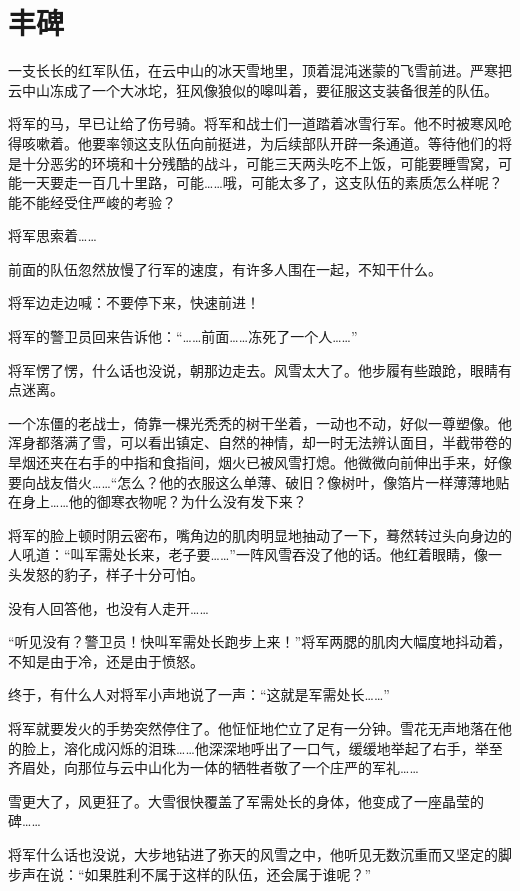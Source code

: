 \documentclass[12pt,UTF-8,openany]{ctexbook}
\begin{document}
\chapter{丰碑}

\begin{large}
    
    一支长长的红军队伍，在云中山的冰天雪地里，顶着混沌迷蒙的飞雪前进。严寒把云中山冻成了一个大冰坨，狂风像狼似的嗥叫着，要征服这支装备很差的队伍。
    
    将军的马，早已让给了伤号骑。将军和战士们一道踏着冰雪行军。他不时被寒风呛得咳嗽着。他要率领这支队伍向前挺进，为后续部队开辟一条通道。等待他们的将是十分恶劣的环境和十分残酷的战斗，可能三天两头吃不上饭，可能要睡雪窝，可能一天要走一百几十里路，可能……哦，可能太多了，这支队伍的素质怎么样呢？能不能经受住严峻的考验？
    
    将军思索着……
    
    前面的队伍忽然放慢了行军的速度，有许多人围在一起，不知干什么。
    
    将军边走边喊：不要停下来，快速前进！
    
    将军的警卫员回来告诉他：“……前面……冻死了一个人……”
    
    将军愣了愣，什么话也没说，朝那边走去。风雪太大了。他步履有些踉跄，眼睛有点迷离。
    
    一个冻僵的老战士，倚靠一棵光秃秃的树干坐着，一动也不动，好似一尊塑像。他浑身都落满了雪，可以看出镇定、自然的神情，却一时无法辨认面目，半截带卷的旱烟还夹在右手的中指和食指间，烟火已被风雪打熄。他微微向前伸出手来，好像要向战友借火……“怎么？他的衣服这么单薄、破旧？像树叶，像箔片一样薄薄地贴在身上……他的御寒衣物呢？为什么没有发下来？
    
    将军的脸上顿时阴云密布，嘴角边的肌肉明显地抽动了一下，蓦然转过头向身边的人吼道：“叫军需处长来，老子要……”一阵风雪吞没了他的话。他红着眼睛，像一头发怒的豹子，样子十分可怕。
    
    没有人回答他，也没有人走开……
    
    “听见没有？警卫员！快叫军需处长跑步上来！”将军两腮的肌肉大幅度地抖动着，不知是由于冷，还是由于愤怒。
    
    终于，有什么人对将军小声地说了一声：“这就是军需处长……”
    
    将军就要发火的手势突然停住了。他怔怔地伫立了足有一分钟。雪花无声地落在他的脸上，溶化成闪烁的泪珠……他深深地呼出了一口气，缓缓地举起了右手，举至齐眉处，向那位与云中山化为一体的牺牲者敬了一个庄严的军礼……
    
    雪更大了，风更狂了。大雪很快覆盖了军需处长的身体，他变成了一座晶莹的碑……
    
    将军什么话也没说，大步地钻进了弥天的风雪之中，他听见无数沉重而又坚定的脚步声在说：“如果胜利不属于这样的队伍，还会属于谁呢？”
    
\end{large}
\end{document}
